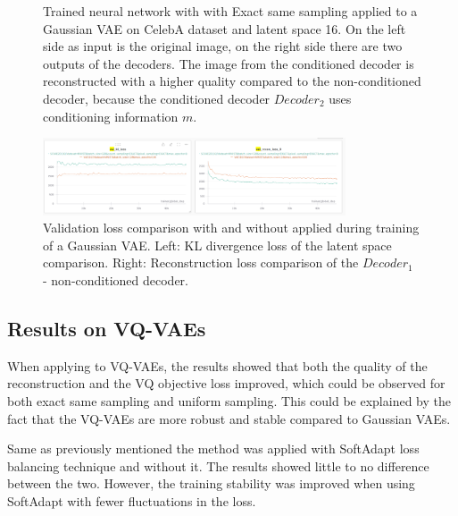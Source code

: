 \begin{figure}[H]
    \centering
    
    \caption[Trained neural network with  applied to a Gaussian VAE.]
    { 
        Trained neural network with  with Exact same sampling applied to a Gaussian VAE on CelebA dataset and latent space 16. 
        On the left side as input is the original image, on the right side there are two outputs of the decoders. 
        The image from the conditioned decoder is reconstructed with a higher quality compared to the non-conditioned decoder, because the conditioned decoder $Decoder_2$ uses conditioning information $m$.
    }
    \label{fig:res_val}
\end{figure}


\begin{figure}[H]
    \centering
    \includegraphics[width=0.8\textwidth]{figures/results/KL_and_RECON.png}
    \caption[Validation loss comparison during training of a Gaussian VAE.]
    {
        Validation loss comparison with and without  applied during training of a Gaussian VAE.
        Left: KL divergence loss of the latent space comparison. Right: Reconstruction loss comparison of the $Decoder_1$ - non-conditioned decoder.
    }
    \label{fig:results_method1_gaussian_vae}
\end{figure}

\subsection{Results on VQ-VAEs}

When applying  to VQ-VAEs, the results showed that both the quality of the reconstruction and the VQ objective loss improved, which could be observed for both exact same sampling and uniform sampling. This could be explained by the fact that the VQ-VAEs are more robust and stable compared to Gaussian VAEs.

Same as previously mentioned the method was applied with SoftAdapt loss balancing technique and without it. The results showed little to no difference between the two. However, the training stability was improved when using SoftAdapt with fewer fluctuations in the loss.



